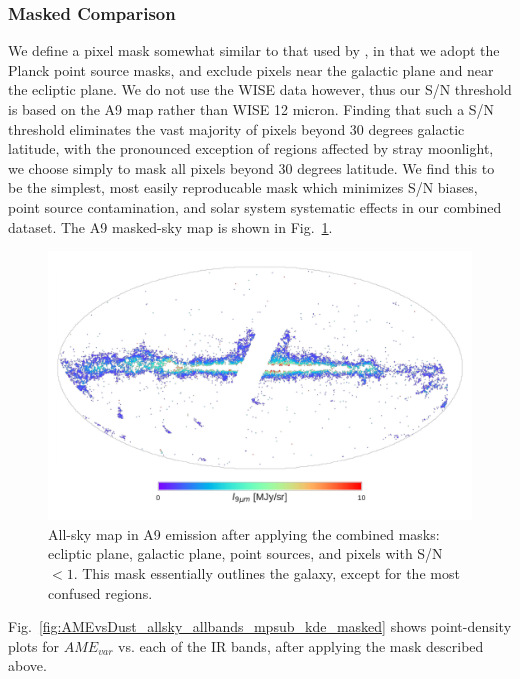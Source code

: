     \subsubsection{Masked Comparison}
        We define a pixel mask somewhat similar to that used by \cite{hensley16}, in that we adopt the Planck point source masks, and exclude pixels near the galactic plane and near the ecliptic plane. We do not use the WISE data however, thus our S/N threshold is based on the A9 map rather than WISE 12 micron. Finding that such a S/N threshold eliminates the vast majority of pixels beyond 30 degrees galactic latitude, with the pronounced exception of regions affected by stray moonlight, we choose simply to mask all pixels beyond 30 degrees latitude. We find this to be the simplest, most easily reproducable mask which minimizes S/N biases, point source contamination, and solar system systematic effects in our combined dataset. The A9 masked-sky map is shown in Fig.~\ref{fig:A9_masked_map}.
        \begin{figure}
          \includegraphics[width=\textwidth]{../Plots/ch_allsky/masked_map_A9.pdf}
          \centering
          \caption{All-sky map in A9 emission after applying the combined masks: ecliptic plane, galactic plane, point sources, and pixels with S/N $<1$. This mask essentially outlines the galaxy, except for the most confused regions.}
          \label{fig:A9_masked_map}
        \end{figure}
         Fig.~\ref{fig:AMEvsDust_allsky_allbands_mpsub_kde_masked} shows point-density plots for $AME_{var}$ vs. each of the IR bands, after applying the mask described above.
